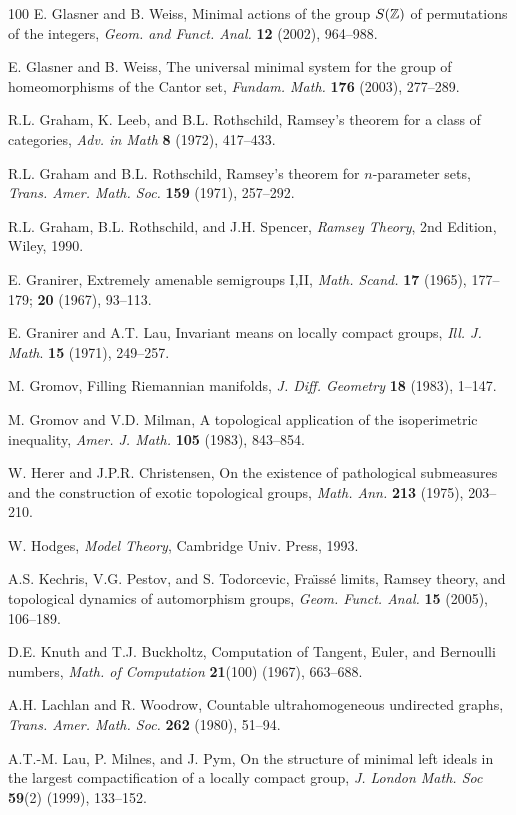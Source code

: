 \begin{thebibliography}{100}
E. Glasner and B. Weiss, Minimal actions of the group \(S(\mathbb{Z})\) of
permutations of the integers, {\it Geom. and Funct. Anal.} {\bf 12} (2002),
964--988.

E. Glasner and B. Weiss, The universal minimal system for the group
of homeomorphisms of the Cantor set, {\it Fundam. Math.}
{\bf 176} (2003), 277--289.

R.L. Graham, K. Leeb, and B.L. Rothschild, Ramsey's theorem for a
class of categories, {\it Adv. in Math} {\bf 8} (1972), 417--433.

R.L. Graham and B.L. Rothschild, Ramsey's theorem for \(n\)-parameter
sets, {\it Trans. Amer. Math. Soc.} {\bf 159} (1971), 257--292.

R.L. Graham, B.L. Rothschild, and J.H. Spencer, {\it Ramsey Theory},
2nd Edition, Wiley, 1990.

 E. Granirer,
Extremely amenable semigroups I,II,
{\it Math. Scand.} {\bf 17} (1965), 177--179; {\bf 20} (1967), 93--113.

E. Granirer and A.T. Lau, Invariant means on locally compact groups,
{\it Ill. J. Math}. {\bf 15} (1971), 249--257.

M. Gromov, Filling Riemannian manifolds, {\it J. Diff. Geometry} {\bf 18} (1983),
1--147.

M. Gromov and V.D. Milman, A topological application of the isoperimetric
inequality, {\it Amer. J. Math.} {\bf 105} (1983), 843--854.

W. Herer and J.P.R. Christensen, On the existence of pathological
submeasures and the construction of exotic topological groups,
{\it Math. Ann.} {\bf 213} (1975), 203--210.

W. Hodges, {\it Model Theory}, Cambridge Univ. Press, 1993.

A.S. Kechris, V.G. Pestov, and S. Todorcevic, Fra\"{\i}ss\'{e} limits,
Ramsey theory, and topological dynamics of automorphism groups,
{\it Geom. Funct. Anal.} {\bf 15} (2005), 106--189.

D.E. Knuth and T.J. Buckholtz, Computation of Tangent, Euler, and Bernoulli
numbers, {\it Math. of Computation} {\bf 21}(100) (1967), 663--688.

A.H. Lachlan and R. Woodrow, Countable ultrahomogeneous undirected
graphs, {\it Trans. Amer. Math. Soc.} {\bf 262} (1980), 51--94.

A.T.-M. Lau, P. Milnes, and J. Pym, On the structure of minimal
left ideals in the largest compactification of a locally compact group,
{\it J. London Math. Soc} {\bf 59}(2) (1999), 133--152.


\end{thebibliography}
